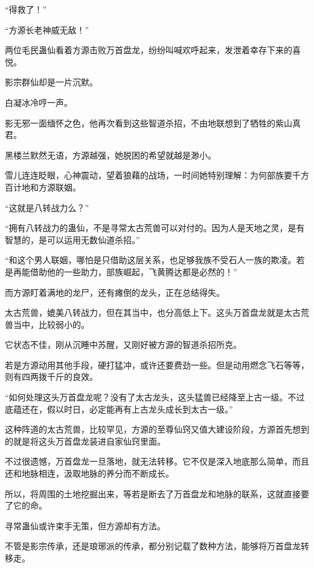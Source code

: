 
\begin{this_body}



“得救了！”

“方源长老神威无敌！”

两位毛民蛊仙看着方源击败万首盘龙，纷纷叫喊欢呼起来，发泄着幸存下来的喜悦。

影宗群仙却是一片沉默。

白凝冰冷哼一声。

影无邪一面缅怀之色，他再次看到这些智道杀招，不由地联想到了牺牲的紫山真君。

黑楼兰默然无语，方源越强，她脱困的希望就越是渺小。

雪儿连连眨眼，心神震动，望着狼藉的战场，一时间她特别理解：为何部族要千方百计地和方源联姻。

“这就是八转战力么？”

“拥有八转战力的蛊仙，不是寻常太古荒兽可以对付的。因为人是天地之灵，是有智慧的，是可以运用无数仙道杀招。”

“和这个男人联姻，哪怕是只借助这层关系，也足够我族不受石人一族的欺凌。若是再能借助他的一些助力，部族崛起，飞黄腾达都是必然的！”

而方源盯着满地的龙尸，还有瘫倒的龙头，正在总结得失。

太古荒兽，媲美八转战力，但在其当中，也分高低上下。这头万首盘龙就是太古荒兽当中，比较弱小的。

它状态不佳，刚从沉睡中苏醒，又刚好被方源的智道杀招所克。

若是方源动用其他手段，硬打猛冲，或许还要费劲一些。但是动用燃念飞石等等，则有四两拨千斤的良效。

“如何处理这头万首盘龙呢？没有了太古龙头，这头猛兽已经降至上古一级。不过底蕴还在，假以时日，必定能再有上古龙头成长到太古一级。”

这种阵道的太古荒兽，比较罕见，方源的至尊仙窍又值大建设阶段，方源首先想到的就是将这头万首盘龙装进自家仙窍里面。

不过很遗憾，万首盘龙一旦落地，就无法转移。它不仅是深入地底那么简单，而且还和地脉相连，汲取地脉的养分而不断成长。

所以，将周围的土地挖掘出来，等若是断去了万首盘龙和地脉的联系，这就直接要了它的命。

寻常蛊仙或许束手无策，但方源却有方法。

不管是影宗传承，还是琅琊派的传承，都分别记载了数种方法，能够将万首盘龙转移走。


\end{this_body}
